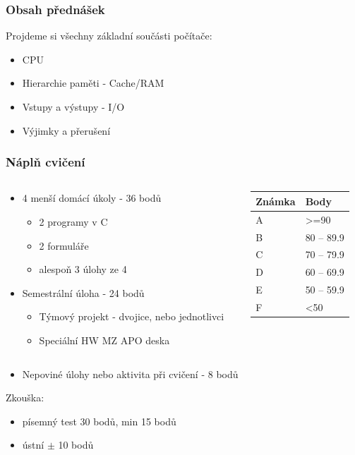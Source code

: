 \documentclass{beamer}
\begin{document}
\begin{frame}
\frametitle{Obsah přednášek}
Projdeme si všechny základní součásti počítače:
\begin{itemize}
\item CPU
\item Hierarchie paměti - Cache/RAM
\item Vstupy a výstupy - I/O
\item Výjimky a přerušení
\end{itemize}
\end{frame}

\begin{frame}
\frametitle{Náplň cvičení}

\begin{columns}
\begin{column}{0.6\textwidth}
\begin{itemize}
\item 4 menší domácí úkoly - 36 bodů
\begin{itemize}
\item 2 programy v C
\item 2 formuláře
\item alespoň 3 úlohy ze 4
\end{itemize}
\item Semestrální úloha - 24 bodů
\begin{itemize}
\item Týmový projekt - dvojice, nebo jednotlivci
\item Speciální HW MZ APO deska
\end{itemize}
\end{itemize}
\end{column}
\begin{column}{0.35\textwidth}  
   \begin{tabular}{|l|l|}\hline
   Známka & Body\\ \hline
   A & >=90\\ \hline
   B & 80 -- 89.9\\ \hline
   C & 70 -- 79.9\\ \hline
   D & 60 -- 69.9\\ \hline
   E & 50 -- 59.9\\ \hline
   F & <50\\ \hline
   \end{tabular}
\end{column}
\end{columns}
\begin{itemize}
\item Nepoviné úlohy nebo aktivita při cvičení - 8 bodů
\end{itemize}
\bigskip
Zkouška: 
\begin{itemize}
\item písemný test 30 bodů, min 15 bodů
\item ústní $\pm$ 10 bodů    
\end{itemize}

\end{frame}
\end{document}
